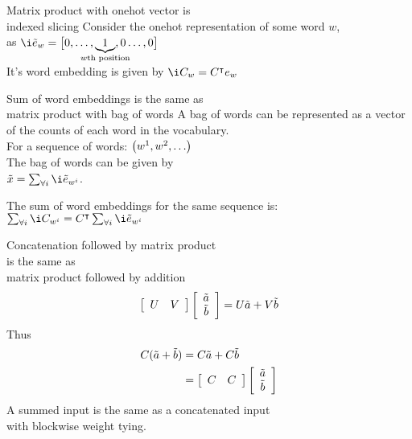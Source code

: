 \documentclass[dvipsnames]{beamer}
\renewcommand{\emph}{\alert}
\newcommand{\countertitle}[1]{\vfill\vfill{\centering \Large \color{bluewrite} #1}\vspace{-0.5cm}}
\begin{document}
\begin{frame}{Matrix product with onehot vector is\\ indexed slicing}
	Consider the \emph{onehot} representation of some word $w$,\\
	as $\iv e_w=\big[0, \ldots, \underbrace{1}_{\mathclap{w\text{th position}}},0 \ldots, 0\big]$\\
	\vspace{0.5cm}
	It's word embedding is given by
	$\i C_{w} = C^\intercal e_w$
\end{frame}

\begin{frame}{Sum of word embeddings is the same as \\ matrix product with bag of words}
	A bag of words can be represented as a vector of the counts of each word in the vocabulary.\\ \vspace{0.5cm}
	For a sequence of words: $\left(\n w_1, \n w_2, \ldots \right)$ \\\vspace{0.5cm}
	The\emph{ bag of words} can be given by\\ $\v x = \sum_{\forall i} \iv e_{\n w_i}$.\\\vspace{0.5cm}
	
	The \emph{sum of word embeddings} for the same sequence is:
	$\sum_{\forall i} \i C_{\n w_i} = C^\intercal \sum_{\forall i} \iv e_{\n w_i}$
\end{frame}

\begin{frame}{Concatenation followed by matrix product\\ is the same as \\matrix product followed by addition}
	\vspace{-0.7cm}
	\begin{equation*}
	\left[\begin{array}{cc}
	U & V\end{array}\right]\left[\begin{array}{c}
	\tilde{a}\\
	\tilde{b}
	\end{array}\right] = U\tilde{a} + V \tilde{b}
	\end{equation*}
	Thus
	\begin{align*}
	C (\tilde{a} + \tilde{b}) &= 
	C\tilde{a} + C \tilde{b} \\&=
	\left[\begin{array}{cc}
	C & C\end{array}\right]\left[\begin{array}{c}
	\tilde{a}\\
	\tilde{b}
	\end{array}\right]
	\end{align*}
	\countertitle{A summed input is the same as a concatenated input\\ with blockwise weight tying.}
	\vfill
	\vfill
	\vfill
	\vfill
	\vfill
\end{frame}
\end{document}
